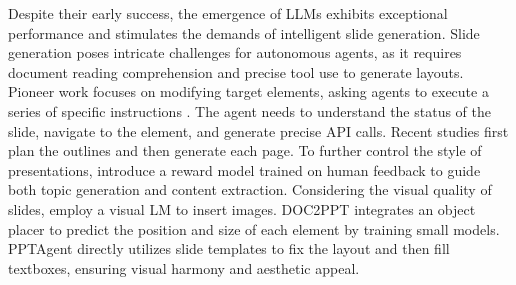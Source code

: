 Despite their early success, the emergence of LLMs exhibits exceptional performance and stimulates the demands of intelligent slide generation.
Slide generation poses intricate challenges for autonomous agents, as it requires document reading comprehension and precise tool use to generate layouts.
Pioneer work focuses on modifying target elements, asking agents to execute a series of specific instructions \cite{guo-etal-2024-pptc}. The agent needs to understand the status of the slide, navigate to the element, and generate precise API calls.
Recent studies first plan the outlines and then generate each page.
To further control the style of presentations, \citet{mondal-etal-2024-presentations} introduce a reward model trained on human feedback to guide both topic generation and content extraction.
Considering the visual quality of slides, \citet{bandyopadhyay-etal-2024-enhancing-presentation} employ a visual LM to insert images. 
DOC2PPT \cite{Fu2021DOC2PPTAP} integrates an object placer to predict the position and size of each element by training small models.
PPTAgent \cite{zheng2025pptagent} directly utilizes slide templates to fix the layout and then fill textboxes, ensuring visual harmony and aesthetic appeal.